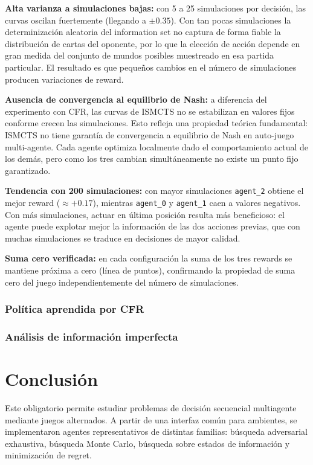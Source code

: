 \documentclass[letterpaper,12pt]{article}
\begin{document}
\textbf{Alta varianza a simulaciones bajas:}
con 5 a 25 simulaciones por decisión, las curvas oscilan
fuertemente (llegando a $\pm 0.35$). Con tan pocas simulaciones
la determinización aleatoria del information set no captura
de forma fiable la distribución de cartas del oponente, por lo
que la elección de acción depende en gran medida del conjunto
de mundos posibles muestreado en esa partida particular. El
resultado es que pequeños cambios en el número de simulaciones
producen variaciones de reward.

\textbf{Ausencia de convergencia al equilibrio de Nash:}
a diferencia del experimento con CFR, las curvas de ISMCTS no
se estabilizan en valores fijos conforme crecen las simulaciones.
Esto refleja una propiedad teórica fundamental: ISMCTS no tiene
garantía de convergencia a equilibrio de Nash en auto-juego
multi-agente. Cada agente optimiza localmente dado el
comportamiento actual de los demás, pero como los tres cambian
simultáneamente no existe un punto fijo garantizado.

\textbf{Tendencia con 200 simulaciones:}
con mayor simulaciones \texttt{agent\_2} obtiene el
mejor reward (${\approx}+0.17$), mientras \texttt{agent\_0} y
\texttt{agent\_1} caen a valores negativos. Con más simulaciones,
actuar en última posición resulta más beneficioso: el agente puede
explotar mejor la información de las dos acciones previas, que con
muchas simulaciones se traduce en decisiones de mayor calidad.

\textbf{Suma cero verificada:}
en cada configuración la suma de los tres rewards se mantiene
próxima a cero (línea de puntos), confirmando la propiedad de
suma cero del juego independientemente del número de simulaciones.



\subsubsection*{Política aprendida por CFR}

\subsubsection*{Análisis de información imperfecta}

\clearpage
\section{Conclusión}

Este obligatorio permite estudiar problemas de decisión secuencial multiagente mediante juegos alternados. A partir de una interfaz común para ambientes, se implementaron agentes representativos de distintas familias: búsqueda adversarial exhaustiva, búsqueda Monte Carlo, búsqueda sobre estados de información y minimización de regret.
\end{document}
